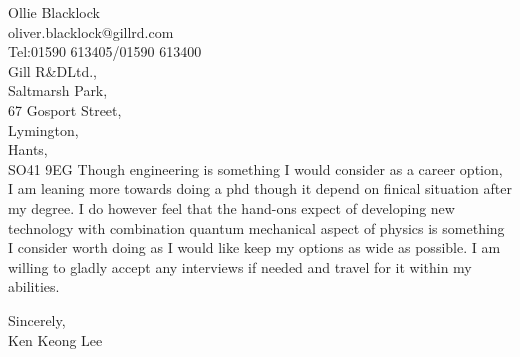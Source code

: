 \documentclass[11pt]{letter} %
\begin{document}
\begin{letter}{Ollie Blacklock\\oliver.blacklock@gillrd.com\\Tel:01590 613405/01590 613400\\Gill R\&DLtd.,\\Saltmarsh Park,\\67 Gosport Street,\\Lymington,\\Hants,\\ SO41 9EG}
Though engineering is something I would consider as a career option, I am leaning more towards doing a phd though it depend on finical situation after my degree. I do however feel that the hand-ons expect of developing new technology with combination quantum mechanical aspect of physics is something I consider worth doing as I would like keep my options as wide as possible. I am willing to gladly accept any interviews if needed and travel for it within my abilities.



\closing{Sincerely,\\Ken Keong Lee}




\end{letter}
\end{document}
